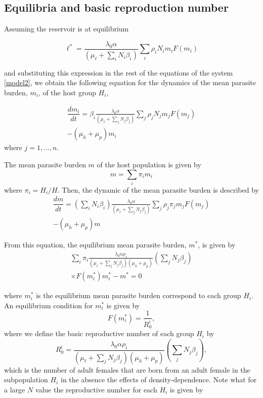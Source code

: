 \documentclass[eng]{MMSB-class-eng}
\begin{document}
{\subsection{Equilibria and basic reproduction number} 
Assuming the reservoir is at equilibrium 

\begin{equation}
\ell^*=\frac{  \lambda_0 \alpha }{(\mu_{\ell}+\sum_i N_i \beta_i  )}   \sum_i \rho_{i} N_{i} m_{i} F(m_{i}) 
\end{equation} 
{\color{red}
and substituting this expression in the rest of the equations of the system \eqref{model2}, we obtain the following equation for the dynamics of the mean parasite burden, $m_{i}$, of the host group $H_{i}$,

\begin{multline}\label{dmi}
\dfrac{dm_{i}}{dt}=\beta_{i} \frac{\lambda_0\alpha}{ (\mu_{\ell}+\sum_j N_j \beta_j) }  
\sum_j     \rho_{j} N_j  m_{j} F(m_{j})\\ 
- (\mu_h+\mu_p) m_{i}
\end{multline}
where $j=1,\ldots,n$.

The mean parasite burden $m$ of the host population is given by
\begin{equation}
m=\sum_i \pi_i m_{i} 
\end{equation}
where $\pi_i=H_i/H$.    Then, the dynamic of the mean parasite burden is described by
\begin{multline}
	\dfrac{dm}{dt}= %
	\left(  \sum_i N_i \beta_{i} \right)
	\frac{ \lambda_0 \alpha }{(\mu_{\ell}+\sum_j N_j \beta_j  )}  
	\sum_j \rho_{j} \pi_{j} m_{j} F(m_{j})\\   -(\mu_{h}+\mu_p) m%
\end{multline}

From this equation, the equilibrium mean parasite burden, $m^*$, is given by
\begin{multline}
	\sum_i \pi_i \frac{ \lambda_0 \alpha \rho_{i}}{ (\mu_{\ell}+\sum_j N_j \beta_j  )(\mu_{h}+\mu_p)} 
	\left( \sum_j N_{j} \beta_{j} \right)\\ 
	\times F( m^*_{i}) m^*_{i}
	- m^*=0 
\end{multline}

where $m_{i}^*$ is the equilibrium mean parasite burden correspond to each group $H_{i}$.
An equilibrium condition for 
$m_{i}^*$
is given by
\begin{equation}%
F(m^*_{i})=\dfrac{1}{R_0^{i}},
\end{equation}
where we define the basic reproductive number of each group $H_i$ by
\begin{equation}%
R_0^{i}=\frac{ \lambda_0 \alpha \rho_{i}}{ (\mu_{\ell}+\sum_j N_j \beta_j )(\mu_{h}+\mu_p)} \left( \sum_j N_j\beta_{j} \right),
\end{equation}
which is the number of adult females that are born from an adult female in the subpopulation $H_i$ in the absence the effects of density-dependence. Note what for a large $N$ value the reproductive number for each $H_i$ is given by

}}
\end{document}
